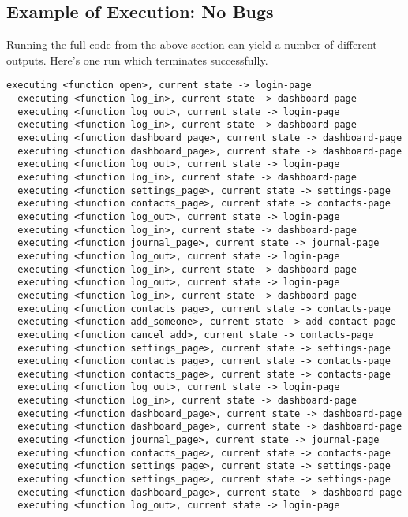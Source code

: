 \subsection{Example of Execution: No Bugs}
Running the full code from the above section can yield a number of different outputs. Here's one run which terminates successfully.

\begin{Verbatim}[fontsize=\small]
  executing <function open>, current state -> login-page
  executing <function log_in>, current state -> dashboard-page
  executing <function log_out>, current state -> login-page
  executing <function log_in>, current state -> dashboard-page
  executing <function dashboard_page>, current state -> dashboard-page
  executing <function dashboard_page>, current state -> dashboard-page
  executing <function log_out>, current state -> login-page
  executing <function log_in>, current state -> dashboard-page
  executing <function settings_page>, current state -> settings-page
  executing <function contacts_page>, current state -> contacts-page
  executing <function log_out>, current state -> login-page
  executing <function log_in>, current state -> dashboard-page
  executing <function journal_page>, current state -> journal-page
  executing <function log_out>, current state -> login-page
  executing <function log_in>, current state -> dashboard-page
  executing <function log_out>, current state -> login-page
  executing <function log_in>, current state -> dashboard-page
  executing <function contacts_page>, current state -> contacts-page
  executing <function add_someone>, current state -> add-contact-page
  executing <function cancel_add>, current state -> contacts-page
  executing <function settings_page>, current state -> settings-page
  executing <function contacts_page>, current state -> contacts-page
  executing <function contacts_page>, current state -> contacts-page
  executing <function log_out>, current state -> login-page
  executing <function log_in>, current state -> dashboard-page
  executing <function dashboard_page>, current state -> dashboard-page
  executing <function dashboard_page>, current state -> dashboard-page
  executing <function journal_page>, current state -> journal-page
  executing <function contacts_page>, current state -> contacts-page
  executing <function settings_page>, current state -> settings-page
  executing <function settings_page>, current state -> settings-page
  executing <function dashboard_page>, current state -> dashboard-page
  executing <function log_out>, current state -> login-page

\end{Verbatim}
